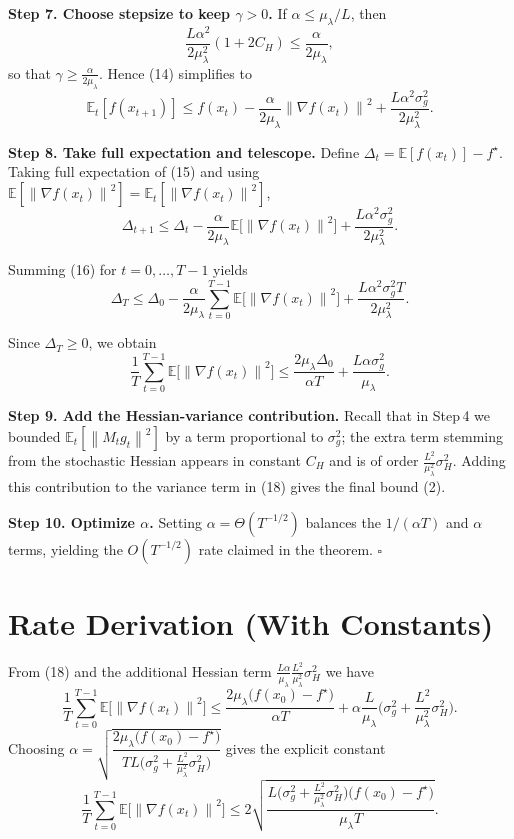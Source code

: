 \documentclass{article}
\newcommand{\E}{\mathbb{E}}
\newcommand{\norm}[1]{\left\|#1\right\|}
\begin{document}
\noindent\textbf{Step 7. Choose stepsize to keep $\gamma>0$.}  
If $\alpha\le\mu_{\lambda}/L$, then
\[
\frac{L\alpha^{2}}{2\mu_{\lambda}^{2}}(1+2C_{H})\le \frac{\alpha}{2\mu_{\lambda}},
\]
so that $\gamma\ge \frac{\alpha}{2\mu_{\lambda}}$. Hence (14) simplifies to
\[
\E_{t}[f(x_{t+1})]\le f(x_{t})-\frac{\alpha}{2\mu_{\lambda}}\norm{\nabla f(x_{t})}^{2}
               +\frac{L\alpha^{2}\sigma_{g}^{2}}{2\mu_{\lambda}^{2}}. \tag{15}
\]

\noindent\textbf{Step 8. Take full expectation and telescope.}  
Define $\Delta_{t}= \E[f(x_{t})]-f^{\star}$. Taking full expectation of (15) and using $\E[\norm{\nabla f(x_{t})}^{2}]=\E_{t}[\norm{\nabla f(x_{t})}^{2}]$,
\[
\Delta_{t+1}\le \Delta_{t}
      -\frac{\alpha}{2\mu_{\lambda}}\E\!\big[\norm{\nabla f(x_{t})}^{2}\big]
      +\frac{L\alpha^{2}\sigma_{g}^{2}}{2\mu_{\lambda}^{2}}. \tag{16}
\]

Summing (16) for $t=0,\dots,T-1$ yields
\[
\Delta_{T}\le \Delta_{0}
   -\frac{\alpha}{2\mu_{\lambda}}\sum_{t=0}^{T-1}\E\!\big[\norm{\nabla f(x_{t})}^{2}\big]
   +\frac{L\alpha^{2}\sigma_{g}^{2}T}{2\mu_{\lambda}^{2}}. \tag{17}
\]

Since $\Delta_{T}\ge0$, we obtain
\[
\frac{1}{T}\sum_{t=0}^{T-1}\E\!\big[\norm{\nabla f(x_{t})}^{2}\big]
\le \frac{2\mu_{\lambda}\Delta_{0}}{\alpha T}
   +\frac{L\alpha\sigma_{g}^{2}}{\mu_{\lambda}}. \tag{18}
\]

\noindent\textbf{Step 9. Add the Hessian‑variance contribution.}  
Recall that in Step 4 we bounded $\E_{t}[\norm{M_{t}g_{t}}^{2}]$ by a term proportional to $\sigma_{g}^{2}$; the extra term stemming from the stochastic Hessian appears in constant $C_{H}$ and is of order $\frac{L^{2}}{\mu_{\lambda}^{2}}\sigma_{H}^{2}$. Adding this contribution to the variance term in (18) gives the final bound (2).

\noindent\textbf{Step 10. Optimize $\alpha$.}  
Setting $\alpha = \Theta(T^{-1/2})$ balances the $1/(\alpha T)$ and $\alpha$ terms, yielding the $O(T^{-1/2})$ rate claimed in the theorem. \hfill $\square$

\section*{Rate Derivation (With Constants)}
From (18) and the additional Hessian term $ \frac{L\alpha}{\mu_{\lambda}}\frac{L^{2}}{\mu_{\lambda}^{2}}\sigma_{H}^{2}$ we have
\[
\frac{1}{T}\sum_{t=0}^{T-1}\E\!\big[\norm{\nabla f(x_{t})}^{2}\big]
\le
\frac{2\mu_{\lambda}\big(f(x_{0})-f^{\star}\big)}{\alpha T}
   +\alpha\frac{L}{\mu_{\lambda}}\Big(\sigma_{g}^{2}+ \frac{L^{2}}{\mu_{\lambda}^{2}}\sigma_{H}^{2}\Big). \tag{19}
\]
Choosing $\alpha = \sqrt{\dfrac{2\mu_{\lambda}\big(f(x_{0})-f^{\star}\big)}
                              {T L\big(\sigma_{g}^{2}+ \frac{L^{2}}{\mu_{\lambda}^{2}}\sigma_{H}^{2}\big)}}$
gives the explicit constant
\[
\frac{1}{T}\sum_{t=0}^{T-1}\E\!\big[\norm{\nabla f(x_{t})}^{2}\big]
\le
2\sqrt{\frac{L\big(\sigma_{g}^{2}+ \frac{L^{2}}{\mu_{\lambda}^{2}}\sigma_{H}^{2}\big)
            \big(f(x_{0})-f^{\star}\big)}{\mu_{\lambda} T}} .
\]
\end{document}
